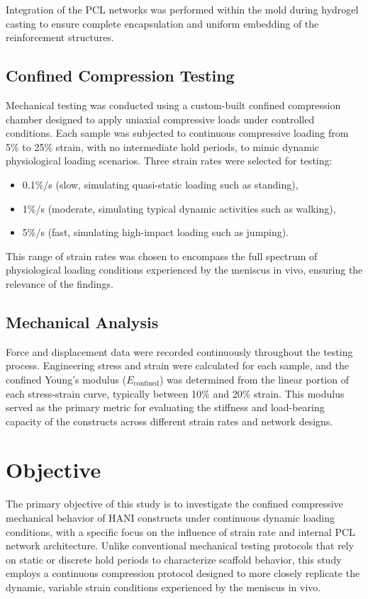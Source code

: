 Integration of the PCL networks was performed within the mold during hydrogel casting to ensure complete encapsulation and uniform embedding of the reinforcement structures.

\subsection{Confined Compression Testing}

Mechanical testing was conducted using a custom-built confined compression chamber designed to apply uniaxial compressive loads under controlled conditions. Each sample was subjected to continuous compressive loading from 5\% to 25\% strain, with no intermediate hold periods, to mimic dynamic physiological loading scenarios. Three strain rates were selected for testing:

\begin{itemize}
    \item 0.1\%/s (slow, simulating quasi-static loading such as standing),
    \item 1\%/s (moderate, simulating typical dynamic activities such as walking),
    \item 5\%/s (fast, simulating high-impact loading such as jumping).
\end{itemize}

This range of strain rates was chosen to encompass the full spectrum of physiological loading conditions experienced by the meniscus in vivo, ensuring the relevance of the findings.

\subsection{Mechanical Analysis}

Force and displacement data were recorded continuously throughout the testing process. Engineering stress and strain were calculated for each sample, and the confined Young's modulus ($E_{\text{confined}}$) was determined from the linear portion of each stress-strain curve, typically between 10\% and 20\% strain. This modulus served as the primary metric for evaluating the stiffness and load-bearing capacity of the constructs across different strain rates and network designs.

\section{Objective}

The primary objective of this study is to investigate the confined compressive mechanical behavior of HANI constructs under continuous dynamic loading conditions, with a specific focus on the influence of strain rate and internal PCL network architecture. Unlike conventional mechanical testing protocols that rely on static or discrete hold periods to characterize scaffold behavior, this study employs a continuous compression protocol designed to more closely replicate the dynamic, variable strain conditions experienced by the meniscus in vivo.

